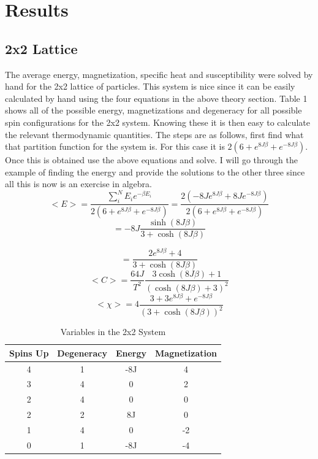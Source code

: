 \documentclass[12pt,righttag]{article}
\begin{document}
\section{Results}
\subsection{2x2 Lattice}
		The average energy, magnetization, specific heat and susceptibility were solved by hand for the 2x2 lattice of particles. This system is nice since it can  be easily calculated by hand using the four equations in the above theory section. Table 1 shows all of the possible energy, magnetizations and degeneracy for all possible spin configurations for the 2x2 system. Knowing these it is then easy to calculate the relevant thermodynamic quantities. The steps are as follows, first find what that partition function for the system is. For this case it is $2(6+e^{8J\beta}+e^{-8J\beta})$. Once this is obtained use the above equations and solve. I will go through the example of finding the energy and provide the solutions to the other three since all this is now is an exercise in algebra.
		\[<E>=\frac{\sum_{i}^{N}E_ie^{-\beta E_i}}{2(6+e^{8J\beta}+e^{-8J\beta})}=\frac{2(-8Je^{8J\beta}+8Je^{-8J\beta})}{2(6+e^{8J\beta}+e^{-8J\beta})}\]
		\[=-8J\frac{\sinh(8J\beta)}{3+\cosh(8J\beta)}\]
		
		\[<|M|>=\frac{2e^{8J\beta}+4}{3+\cosh(8J\beta)}\]
		\[<C>=\frac{64J}{T^2}\frac{3\cosh(8J\beta)+1}{(\cosh(8J\beta)+3)^2}\]
		\[<\chi>=4\frac{3+3e^{8J\beta}+e^{-8J\beta}}{(3+\cosh(8J\beta))^2}\]
		
		
		
	
	\begin{table}
		\begin{center}
			\caption{Variables in the 2x2 System}
			\begin{tabular}{c c c c}
				\hline\hline
				Spins Up & Degeneracy & Energy & Magnetization  \\ 
				\hline
				4 & 1 & -8J & 4\\
				3 & 4 & 0 & 2 \\
				2 & 4 & 0 & 0 \\
				2 & 2 & 8J & 0 \\
				1 & 4 & 0 & -2\\
				0 & 1 & -8J & -4 \\
				
				\hline
			\end{tabular}
		\end{center}
	\end{table}
\end{document}
